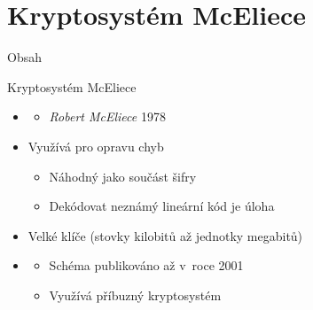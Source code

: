 \documentclass{beamer}
\begin{document}
\section{Kryptosystém McEliece}
\begin{frame}{Obsah}
    \tableofcontents[currentsection]
\end{frame}

\begin{frame}{Kryptosystém McEliece}
    \begin{itemize}

        \item {}
            \begin{itemize}
                \item \emph{Robert McEliece} 1978~\cite{McEliece}
            \end{itemize}

            \pause
        \item Využívá  pro opravu chyb

            \begin{itemize}
                \item Náhodný  jako součást šifry
                \item Dekódovat neznámý lineární kód je 
                    úloha~\cite{Berlekamp1}
            \end{itemize}

            \pause
        \item \alert{Velké klíče} (stovky kilobitů až jednotky megabitů)

            \pause
        \item {}

            \pause
        \begin{itemize}

            \item Schéma publikováno až v~roce 2001~\cite{Courtois}
            \item Využívá příbuzný kryptosystém ~\cite{Niederreiter}

        \end{itemize}
    \end{itemize}
\end{frame}
\end{document}
